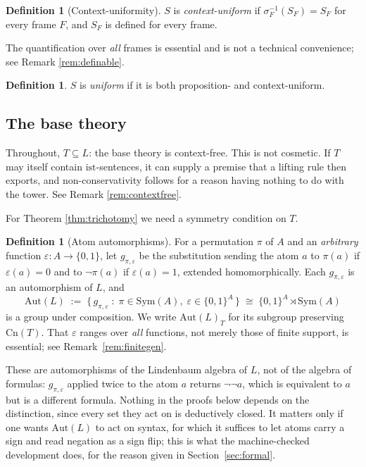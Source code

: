 \documentclass[11pt]{article}
\theoremstyle{plain}
\theoremstyle{definition}
\newtheorem{definition}[theorem]{Definition}
\theoremstyle{remark}
\newcommand{\ist}{\mathrm{ist}}
\newcommand{\Cn}{\mathrm{Cn}}
\newcommand{\Aut}{\mathrm{Aut}}
\begin{document}
\begin{definition}[Context-uniformity]
$S$ is \emph{context-uniform} if $\sigma_F^{-1}(S_F) = S_F$ for every frame $F$,
and $S_F$ is defined for every frame.
\end{definition}

The quantification over \emph{all} frames is essential and is not a technical
convenience; see Remark \ref{rem:definable}.

\begin{definition}
$S$ is \emph{uniform} if it is both proposition- and context-uniform.
\end{definition}

\subsection{The base theory}

Throughout, $T \subseteq L$: the base theory is context-free. This is not
cosmetic. If $T$ may itself contain $\ist$-sentences, it can supply a premise
that a lifting rule then exports, and non-conservativity follows for a reason
having nothing to do with the tower. See Remark \ref{rem:contextfree}.

For Theorem \ref{thm:trichotomy} we need a symmetry condition on $T$.

\begin{definition}[Atom automorphisms]\label{def:aut}
For a permutation $\pi$ of $A$ and an \emph{arbitrary} function
$\varepsilon \colon A \to \{0,1\}$, let $g_{\pi,\varepsilon}$ be the
substitution sending the atom $a$ to $\pi(a)$ if $\varepsilon(a)=0$ and to
$\neg\pi(a)$ if $\varepsilon(a)=1$, extended homomorphically. Each
$g_{\pi,\varepsilon}$ is an automorphism of $L$, and
\[
\Aut(L) \;:=\; \{\, g_{\pi,\varepsilon} \;:\; \pi \in \mathrm{Sym}(A),\;
\varepsilon \in \{0,1\}^{A} \,\}
\;\cong\; \{0,1\}^{A} \rtimes \mathrm{Sym}(A)
\]
is a group under composition. We write $\Aut(L)_T$ for its subgroup preserving
$\Cn(T)$. That $\varepsilon$ ranges over \emph{all} functions, not merely those
of finite support, is essential; see Remark~\ref{rem:finitegen}.
\end{definition}

These are automorphisms of the Lindenbaum algebra of $L$, not of the algebra of
formulas: $g_{\pi,\varepsilon}$ applied twice to the atom $a$ returns
$\neg\neg a$, which is equivalent to $a$ but is a different formula. Nothing in
the proofs below depends on the distinction, since every set they act on is
deductively closed. It matters only if one wants $\Aut(L)$ to act on syntax, for
which it suffices to let atoms carry a sign and read negation as a sign flip;
this is what the machine-checked development does, for the reason given in
Section~\ref{sec:formal}.
\end{document}
